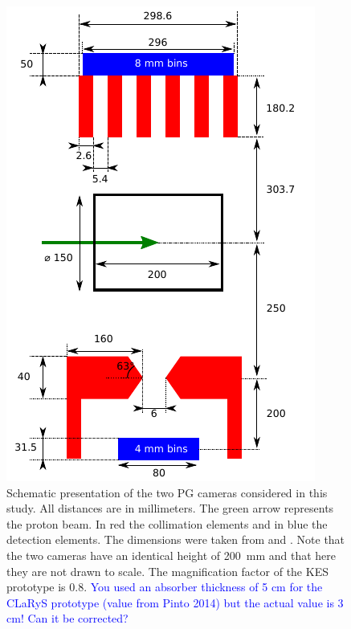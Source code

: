 \documentclass[a4paper,english,12pt]{article}
\newcommand{\et}[2][blue]{\textcolor{#1}{#2}}
\begin{document}
\begin{figure}
  \centering
  \includegraphics[width=0.5\linewidth]{detectors_cyl2}
	\caption{Schematic presentation of the two PG cameras considered in this study. All distances are in millimeters. The green arrow represents the proton beam. In red the collimation elements and in blue the detection elements. The dimensions were taken from \cite{Pinto2014a} and \cite{Perali2014,Sterpin2015}. Note that the two cameras have an identical height of 200~mm and that here they are not drawn to scale. The magnification factor of the KES prototype is 0.8. \et{You used an absorber thickness of 5 cm for the CLaRyS prototype (value from Pinto 2014) but the actual value is 3 cm! Can it be corrected?}}
  \label{fig:detectors}
\end{figure}
\end{document}
